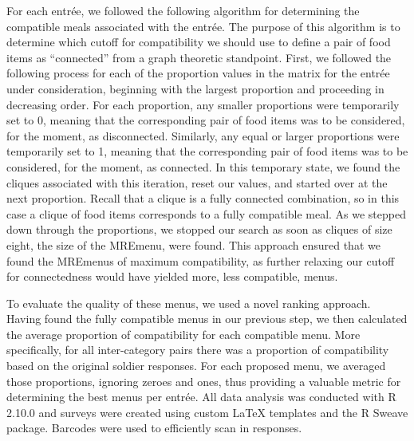 For each entrée, we followed the following algorithm for determining the compatible meals associated with the entrée.  The purpose of this algorithm is to determine which cutoff for compatibility we should use to define a pair of food items as “connected” from a graph theoretic standpoint.  First, we followed the following process for each of the proportion values in the matrix for the entrée under consideration, beginning with the largest proportion and proceeding in decreasing order.  For each proportion, any smaller proportions were temporarily set to 0, meaning that the corresponding pair of food items was to be considered, for the moment, as disconnected.  Similarly, any equal or larger proportions were temporarily set to 1, meaning that the corresponding pair of food items was to be considered, for the moment, as connected.  In this temporary state, we found the cliques associated with this iteration, reset our values, and started over at the next proportion.  Recall that a clique is a fully connected combination, so in this case a clique of food items corresponds to a fully compatible meal.  As we stepped down through the proportions, we stopped our search as soon as cliques of size eight, the size of the MRE\tm menu, were found.  This approach ensured that we found the MRE\tm menus of maximum compatibility, as further relaxing our cutoff for connectedness would have yielded more, less compatible, menus.  

To evaluate the quality of these menus, we used a novel ranking approach.  Having found the fully compatible menus in our previous step, we then calculated the average proportion of compatibility for each compatible menu.  More specifically, for all inter-category pairs there was a proportion of compatibility based on the original soldier responses.  For each proposed menu, we averaged those proportions, ignoring zeroes and ones, thus providing a valuable metric for determining the best menus per entrée.  All data analysis was conducted with R 2.10.0 and surveys were created using custom LaTeX templates and the R Sweave package.  Barcodes were used to efficiently scan in responses.

